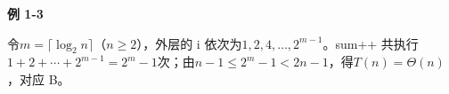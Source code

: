 {\color{ink}\bfseries 例 1-3}\par\vspace{1bp}令\(m=\allowbreak{}\lceil \operatorname{log}_{2}n\rceil \)（\(n\ge 2\)），外层的 i 依次为\(1,\allowbreak{}2,\allowbreak{}4,\allowbreak{}\ldots ,\allowbreak{}2^{m-1}\)。sum+\allowbreak{}+\allowbreak{} 共执行\(1+\allowbreak{}2+\allowbreak{}\cdots +\allowbreak{}2^{m-1}=\allowbreak{}2^{m}-1\)次；由\(n-1\le 2^{m}-1<\allowbreak{}2n-1\)，得\(T(n)=\allowbreak{}\Theta (n)\)，对应 B。
